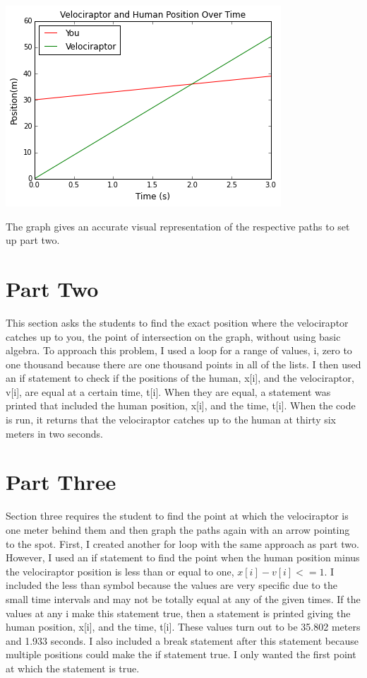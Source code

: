 \documentclass[twocolumn]{revtex4}
\begin{document}
\includegraphics[scale=.6]{graph1.png}

The graph gives an accurate visual representation of the respective paths to set up part two.


\section{Part Two}
This section asks the students to find the exact position where the velociraptor catches up to you, the point of intersection on the graph, without using basic algebra. To approach this problem, I used a loop for a range of values, i, zero to one thousand because there are one thousand points in all of the lists. I then used an if statement to check if the positions of the human, x[i], and the velociraptor, v[i], are equal at a certain time, t[i]. When they are equal, a statement was printed that included the human position, x[i], and the time, t[i]. When the code is run, it returns that the velociraptor catches up to the human at thirty six meters in two seconds.
\section{Part Three}
Section three requires the student to find the point at which the velociraptor is one meter behind them and then graph the paths again with an arrow pointing to the spot. First, I created another for loop with the same approach as part two. However, I used an if statement to find the point when the human position minus the velociraptor position is less than or equal to one, $x[i]-v[i]<=1$. I included the less than symbol because the values are very specific due to the small time intervals and may not be totally equal at any of the given times. If the values at any i make this statement true, then a statement is printed giving the human position, x[i], and the time, t[i]. These values turn out to be 35.802 meters and 1.933 seconds. I also included a break statement after this statement because multiple positions could make the if statement true. I only wanted the first point at which the statement is true.
\end{document}
